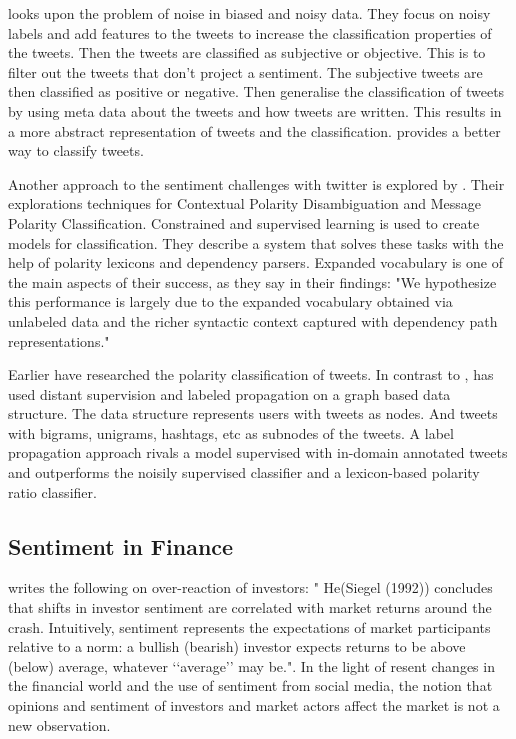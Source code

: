 \cite[]{barbosa10} looks upon the problem of noise in biased and noisy data. 
They focus on noisy labels and add features to the tweets to increase the
classification properties of the tweets. Then the tweets are classified as
subjective or objective. This is to filter out the tweets that don't project a
sentiment. The subjective tweets are then classified as positive or negative.
Then \cite[]{barbosa10} generalise the classification of tweets by using meta
data about the tweets and how tweets are written. This results in a more
abstract representation of tweets and the classification. \cite[]{barbosa10}
provides a better way to classify tweets.

Another approach to the sentiment challenges with twitter is explored by
\cite[]{becker13}. Their explorations techniques for Contextual Polarity Disambiguation
and Message Polarity Classification. Constrained and supervised learning is
used to create models for classification. They describe a system that solves
these tasks with the help of polarity lexicons and dependency parsers. 
Expanded vocabulary is one of the main aspects of their success, as they say in
their findings: "We hypothesize this performance is largely due to the expanded vocabulary
obtained via unlabeled data and the richer syntactic context captured with
dependency path representations." \cite[]{becker13}

Earlier \cite[]{sperious11} have researched the polarity classification of tweets. 
In contrast to \cite[]{becker13}, \cite[]{sperious11} has used distant
supervision and labeled propagation on a graph based data structure. The data
structure represents users with tweets as nodes. And tweets with bigrams,
unigrams, hashtags, etc as subnodes of the tweets. A label propagation approach
rivals a model supervised with in-domain annotated tweets and outperforms the
noisily supervised classifier and a lexicon-based polarity ratio classifier.
\cite[]{sperious11} 

\subsection{Sentiment in Finance}
\cite[p2]{Brown20041} writes the following on over-reaction of investors: "
He(Siegel (1992)) concludes that shifts in investor sentiment are correlated
with market returns around the crash. Intuitively, sentiment represents the
expectations of market participants relative to a norm: a bullish (bearish)
investor expects returns to be above (below) average, whatever ‘‘average’’ may
be.". In the light of resent changes in the financial world and the use
of sentiment from social media, the notion that opinions and sentiment of
investors and market actors affect the market is not a new observation.

